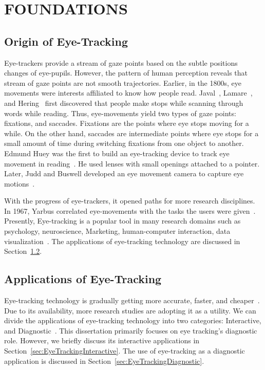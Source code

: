 \chapter{FOUNDATIONS}
\label{chap:Foundations}
\section{Origin of Eye-Tracking}
Eye-trackers provide a stream of gaze points based on the subtle positions changes of eye-pupils. However, the pattern of human perception reveals that stream of gaze points are not smooth trajectories. Earlier, in the 1800s, eye movements were interests affiliated to know how people read.  Javal~\cite{javal1878essai}, Lamare~\cite{lamare1893mouvements}, and  Hering~\cite{hering1879raumsinn} first discovered that people make stops while scanning through words while reading. Thus, eye-movements yield two types of gaze points: fixations, and saccades. Fixations are the points where eye stops moving for a while. On the other hand, saccades are intermediate points where eye stops for a small amount of time during switching fixations from one object to another. Edmund Huey was the first to build an eye-tracking device to track eye movement in reading~\cite{huey1908psychology}. He used lenses with small openings attached to a pointer. Later, Judd and Buswell developed an eye movement camera to capture eye motions~\cite{judd1922silent}. 

With the progress of eye-trackers, it opened paths for more research disciplines. In 1967, Yarbus correlated eye-movements with the tasks the users were given~\cite{yarbus1967eye}. Presently, Eye-tracking is a popular tool in many research domains such as psychology, neuroscience, Marketing, human-computer interaction, data visualization~\cite{Duch02}. The applications of eye-tracking technology are discussed in Section~\ref{sec:EyeTrackingApplication}.



\section{Applications of Eye-Tracking}
\label{sec:EyeTrackingApplication}
Eye-tracking technology is gradually getting more accurate, faster, and cheaper~\cite{Duch07}. Due to its availability, more research studies are adopting it as a utility. We can divide the applications of eye-tracking technology into two categories: Interactive, and Diagnostic~\cite{Duch02}. This dissertation primarily focuses on eye tracking's diagnostic role. However, we briefly discuss its interactive applications in Section~\ref{sec:EyeTrackingInteractive}. The use of eye-tracking as a diagnostic application is discussed in Section~\ref{sec:EyeTrackingDiagnostic}. 

